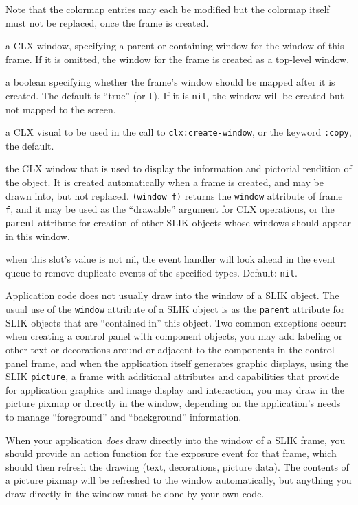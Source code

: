 \documentclass[twoside,openright,11pt]{report}
\newcommand{\tp}[1]{\texttt{#1}}
\begin{document}
Note that the colormap entries may each be modified but the colormap
itself must not be replaced, once the frame is created.

{a CLX window, specifying a parent or containing window for the window
of this frame.  If it is omitted, the window for the frame is created
as a top-level window.}

{a boolean specifying whether the frame's window should be mapped
after it is created.  The default is ``true'' (or \tp{t}).  If it is
\tp{nil}, the window will be created but not mapped to the screen.}

{a CLX visual to be used in the call to \tp{clx:create-window}, or the
keyword \tp{:copy}, the default.}

{the CLX window that is used to display the information and pictorial
rendition of the object.  It is created automatically when a frame is
created, and may be drawn into, but not replaced.  \tp{(window f)}
returns the \tp{window} attribute of frame \tp{f}, and it may be
used as the ``drawable'' argument for CLX operations, or the
\tp{parent} attribute for creation of other SLIK objects whose
windows should appear in this window.}

{when this slot's value is not nil, the event handler will look ahead
in the event queue to remove duplicate events of the specified types.
Default: \tp{nil}.}

Application code does not usually draw into the window of a SLIK
object.  The usual use of the \tp{window} attribute of a SLIK object
is as the \tp{parent} attribute for SLIK objects that are ``contained
in'' this object.  Two common exceptions occur: when creating a
control panel with component objects, you may add labeling or other
text or decorations around or adjacent to the components in the
control panel frame, and when the application itself generates graphic
displays, using the SLIK \tp{picture}, a frame with additional
attributes and capabilities that provide for application graphics and
image display and interaction, you may draw in the picture pixmap or
directly in the window, depending on the application's needs to manage
``foreground'' and ``background'' information.

When your application \emph{does} draw directly into the window of a
SLIK frame, you should provide an action function for the exposure
event for that frame, which should then refresh the drawing (text,
decorations, picture data).  The contents of a picture pixmap will be
refreshed to the window automatically, but anything you draw directly
in the window must be done by your own code.
\end{document}

